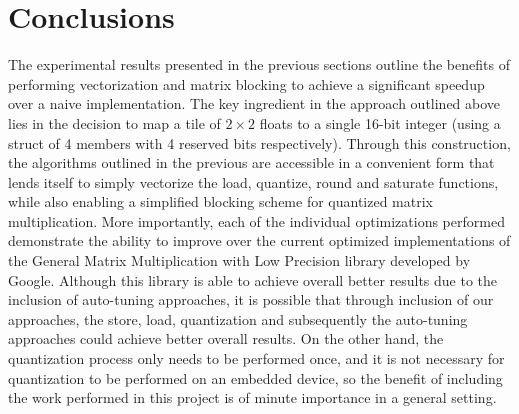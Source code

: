 \section{Conclusions}
The experimental results presented in the previous sections outline
the benefits of performing vectorization and matrix blocking to achieve
a significant speedup over a naive implementation. The key ingredient in
the approach outlined above lies in the decision to map a tile of $2 \times 2$
floats to a single 16-bit integer (using a struct of 4 members with 4 reserved bits
respectively). Through this construction, the algorithms outlined in the previous are accessible
in a convenient form that lends itself to simply vectorize the load, quantize, round and saturate functions,
while also enabling a simplified blocking scheme for quantized matrix multiplication. More importantly,
each of the individual optimizations performed demonstrate the ability to improve over the current optimized
implementations of the General Matrix Multiplication with Low Precision library developed by Google. Although
this library is able to achieve overall better results due to the inclusion of auto-tuning approaches, it is possible
that through inclusion of our approaches, the store, load, quantization and subsequently the auto-tuning approaches could
achieve better overall results. On the other hand, the quantization process only needs to be performed once, and
it is not necessary for quantization to be performed on an embedded device, so the benefit of including the work performed
in this project is of minute importance in a general setting. 
%
